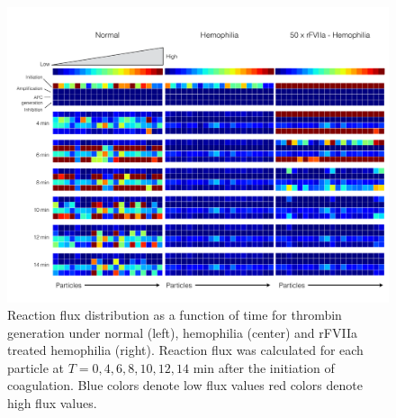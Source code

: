 \documentclass[12pt]{article}
\begin{document}
\begin{figure}
\centering
\includegraphics[width=1.0\textwidth]{./figs/Figure-8-Flux-rFVIIa-Trigger.pdf}
\caption{Reaction flux distribution as a function of time for thrombin generation under normal (left), hemophilia (center) and rFVIIa treated hemophilia (right).
Reaction flux was calculated for each particle at $T = 0,4,6,8,10,12,14$ min after the initiation of coagulation. 
Blue colors denote low flux values red colors denote high flux values. }\label{fig-flux-analysis}
\end{figure}

\clearpage

\renewcommand\thefigure{S\arabic{figure}}
\renewcommand\thetable{T\arabic{table}}
\renewcommand\thepage{S-\arabic{page}}
\renewcommand\theequation{S\arabic{equation}}

\setcounter{equation}{0}
\setcounter{table}{0}
\setcounter{figure}{0}
\setcounter{page}{1}
\end{document}
